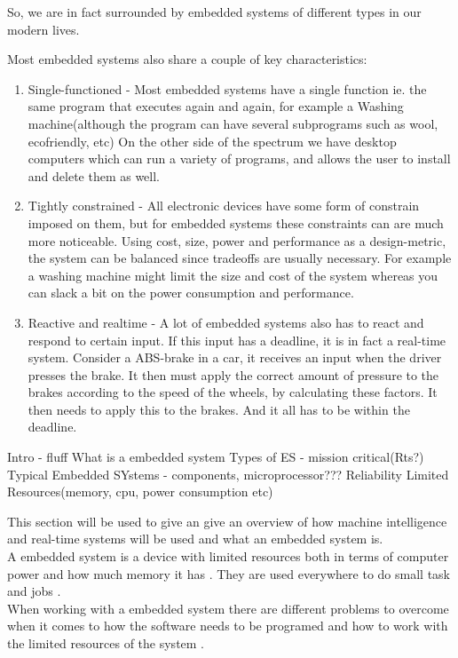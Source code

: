 So, we are in fact surrounded by embedded systems of different types in our modern lives.

Most embedded systems also share a couple of key characteristics:

\begin{enumerate}
  \item Single-functioned - Most embedded systems have a single function ie. the same program that executes again and again, for example a Washing machine(although the program can have several subprograms such as wool, ecofriendly, etc)
  On the other side of the spectrum we have desktop computers which can run a variety of programs, and allows the user to install and delete them as well.
  \item Tightly constrained - All electronic devices have some form of constrain imposed on them, but for embedded systems these constraints can
  are much more noticeable. Using cost, size, power and performance as a design-metric, the system can be balanced since tradeoffs are usually necessary. For example a washing machine might limit the size and cost of the system whereas you can slack a bit on the power consumption and performance.
  \item Reactive and realtime - A lot of embedded systems also has to react and respond to certain input. If this input has a deadline, it is in fact a real-time system. Consider a ABS-brake in a car, it receives an input when the driver presses the brake.
  It then must apply the correct amount of pressure to the brakes according to the speed of the wheels, by calculating these factors. It then needs to apply this to the brakes. And it all has to be within the deadline.
\end{enumerate}
Intro - fluff
What is a embedded system
Types of ES - mission critical(Rts?)
Typical Embedded SYstems - components, microprocessor???
Reliability
Limited Resources(memory, cpu, power consumption etc)


This section will be used to give an give an overview of how machine
intelligence and real-time systems will be used and what an embedded system
is.\\

A embedded system is a device with limited resources both in terms of computer
power and how much memory it has \PS. They are used everywhere to do small task
and jobs \PS.\\

When working with a embedded system there are different problems to overcome
when it comes to how the software needs to be programed and how to work with the
limited resources of the system \PS.\\

%
%
